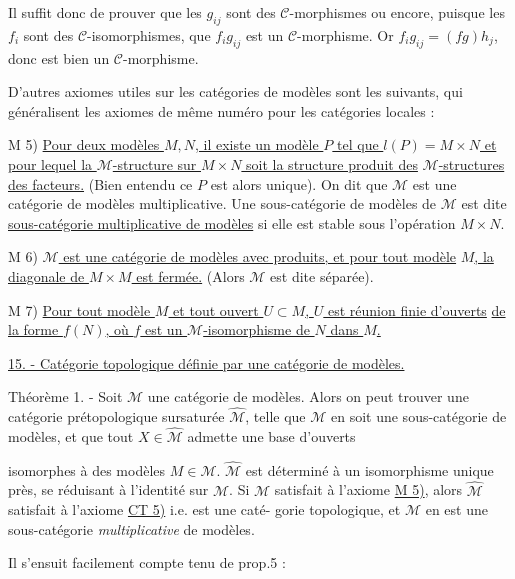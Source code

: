 Il suffit donc de prouver que les $g_{ij}$ sont des $\mathcal{C}$-morphismes ou encore, puisque les $f_i$ sont des $\mathcal{C}$-isomorphismes, que $f_i g_{ij}$ est un $\mathcal{C}$-morphisme. Or $f_i g_{ij} = (fg)h_j$, donc est bien un $\mathcal{C}$-morphisme.

D'autres axiomes utiles sur les catégories de modèles sont les suivants, qui généralisent les axiomes de même numéro pour les catégories locales :

M 5) \underline{Pour deux modèles $M,N$, il existe un modèle $P$ tel que $l(P)= M \times N$ et}
\underline{pour lequel la $\mathcal{M}$-structure sur $M \times N$ soit la structure produit des}
\underline{$\mathcal{M}$-structures des facteurs.}
(Bien entendu ce $P$ est alors unique). On dit que $\mathcal{M}$ est une catégorie de modèles multiplicative. Une sous-catégorie de modèles de $\mathcal{M}$ est dite \underline{sous-catégorie multiplicative de modèles} si elle est stable sous l'opération $M \times N$.

M 6) \underline{$\mathcal{M}$ est une catégorie de modèles avec produits, et pour tout modèle}
\underline{$M$, la diagonale de $M \times M$ est fermée.} (Alors $\mathcal{M}$ est dite séparée).

M 7) \underline{Pour tout modèle $M$ et tout ouvert $U \subset M$, $U$ est réunion finie d'ouverts}
\underline{de la forme $f(N)$, où $f$ est un $\mathcal{M}$-isomorphisme de $N$ dans $M$.}

\underline{15. - Catégorie topologique définie par une catégorie de modèles.}

Théorème 1. - Soit $\mathcal{M}$ une catégorie de modèles. Alors on peut trouver une catégorie prétopologique sursaturée $\hat{\mathcal{M}}$, telle que $\mathcal{M}$ en soit une sous-catégorie de modèles, et que tout $X \in \hat{\mathcal{M}}$ admette une base d'ouverts

\newpage



isomorphes à des modèles $M \in \mathcal{M}$. $\hat{\mathcal{M}}$ est déterminé à un isomorphisme
unique près, se réduisant à l'identité sur $\mathcal{M}$. Si $\mathcal{M}$ satisfait à
l'axiome \underline{M 5)}, alors $\hat{\mathcal{M}}$ satisfait à l'axiome \underline{CT 5)} i.e. est une caté-
gorie topologique, et $\mathcal{M}$ en est une sous-catégorie \emph{multiplicative} de
modèles.

Il s'ensuit facilement compte tenu de prop.5 :


